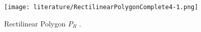 \begin{figure}[h!]
    \centering
    \texttt{[image: literature/RectilinearPolygonComplete4-1.png]}
    \caption{Rectilinear Polygon $P_R$ \cite{1057165}.}
    \label{fig:rectilinear}
\end{figure}

